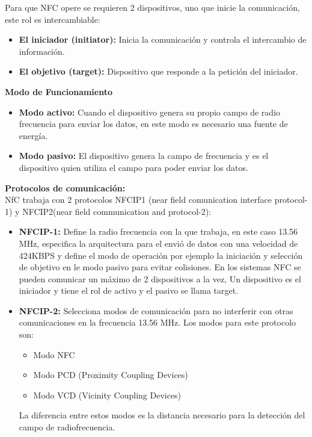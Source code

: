 \documentclass[11pt,openany]{book}
\begin{document}
	Para que NFC opere se requieren 2 dispositivos, uno que inicie la comunicación, este rol es intercambiable:
	\begin{itemize}
		\item \textbf{El iniciador (initiator): }Inicia la comunicación y controla el intercambio de información.
		\item \textbf{El objetivo (target): }Dispositivo que responde a la petición del iniciador.
	\end{itemize}
	\textbf{Modo de Funcionamiento}
	\begin{itemize}
		\item \textbf{Modo activo: }Cuando el dispositivo genera su propio campo de radio frecuencia para enviar los datos, en este modo es necesario una fuente de energía.
		\item \textbf{Modo pasivo: }El dispositivo genera la campo de frecuencia y es el dispositivo quien utiliza el campo para poder enviar los datos.
	\end{itemize}

	\textbf{Protocolos de comunicación: }\\[0.25cm]
	NfC trabaja con 2 protocolos NFCIP1 (near field comunication interface protocol-1) y NFCIP2(near field communication and protocol-2):
	\begin{itemize}
		\item \textbf{NFCIP-1: }Define la radio frecuencia con la que trabaja, en este caso 13.56 MHz, especifica la arquitectura para el envió de datos con una velocidad de 424KBPS y define el modo de operación por ejemplo la iniciación y selección de objetivo en le modo pasivo para evitar colisiones. En los sistemas NFC se pueden comunicar un máximo de 2 dispositivos  a la vez, Un dispositivo es el iniciador y tiene el rol de activo y el pasivo se llama target.
		\item \textbf{NFCIP-2: }Selecciona modos de comunicación para no interferir con otras comunicaciones en la frecuencia 13.56 MHz. Los modos para este protocolo son:
		\begin{itemize}
			\item Modo NFC
			\item Modo PCD (Proximity Coupling Devices)
			\item Modo VCD (Vicinity Coupling Devices)
		\end{itemize}
		La diferencia entre estos modos es la distancia necesario para la detección del campo de radiofrecuencia.
	\end{itemize}
\end{document}
